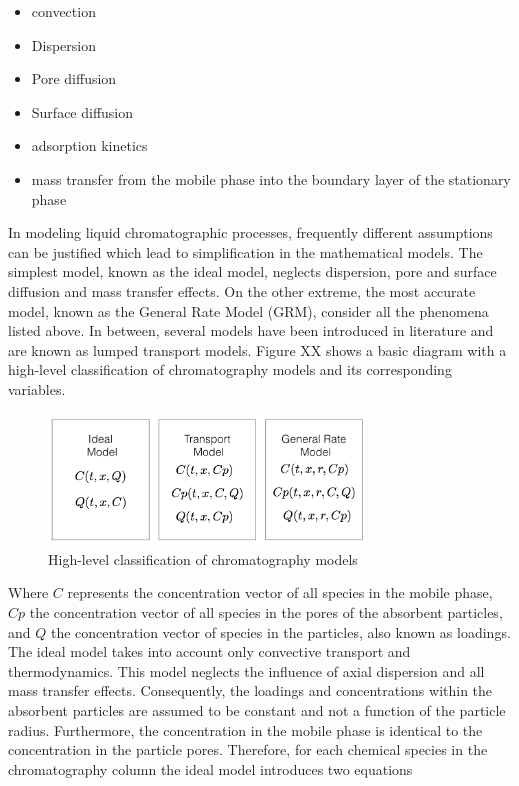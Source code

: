 \documentclass[paper=a4, fontsize=11pt]{scrartcl}
\begin{document}
\begin{itemize}
\item convection
\item Dispersion
\item Pore diffusion
\item Surface diffusion
\item adsorption kinetics
\item mass transfer from the mobile phase into the boundary layer of the stationary phase
\end{itemize}

In modeling liquid chromatographic processes, frequently different assumptions can be justified which lead to simplification in the mathematical models. The simplest model, known as the ideal model, neglects dispersion, pore and surface diffusion and mass transfer effects. On the other extreme, the most accurate model, known as the General Rate Model (GRM), consider all the phenomena listed above. In between, several models have been introduced in literature and are known as lumped transport models. Figure XX shows a basic diagram with a high-level classification of chromatography models and its corresponding variables.

\begin{figure}[h]
\centering
\label{cmodels}
\includegraphics[width=0.75\textwidth]{models.png}
\caption{High-level classification of chromatography models}
\end{figure}

Where $C$ represents the concentration vector of all species in the mobile phase, $Cp$ the concentration vector of all species in the pores of the absorbent particles, and $Q$ the concentration vector of species in the particles, also known as loadings. The ideal model takes into account only convective transport and thermodynamics. This model neglects the influence of axial dispersion and all mass transfer effects. Consequently, the loadings and concentrations within the absorbent particles are assumed to be constant and not a function of the particle radius. Furthermore, the concentration in the mobile phase is identical to the concentration in the particle pores. Therefore, for each chemical species in the chromatography column the ideal model introduces two equations
\end{document}

